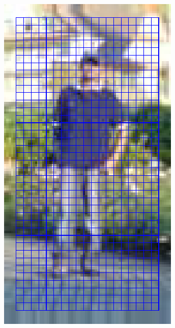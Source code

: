 \documentclass[thesis.tex]{subfiles}
\begin{document}
\begin{figure}[tb]
{\begin{subfigure}[t]{0.17\textwidth}
		\includegraphics[width=\textwidth]{img/inriaExampleCells.pdf}
		\caption{}
		\label{fig:inriaExampleCells}
		\vspace{2mm}
	\end{subfigure}
	\begin{subfigure}[t]{0.17\textwidth}

\end{subfigure}}
\end{figure}
\end{document}
